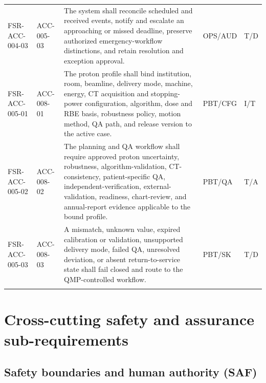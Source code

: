 \documentclass[11pt,letterpaper]{article}
\begin{document}
\begin{scriptsize}
\begin{longtable}{@{}L{0.16\textwidth}L{0.12\textwidth}L{0.45\textwidth}L{0.15\textwidth}L{0.07\textwidth}@{}}
\addlinespace[2pt]
\mbox{FSR-ACC-004-03} & \mbox{ACC-005-03} & The system shall reconcile scheduled and received events, notify and escalate an approaching or missed deadline, preserve authorized emergency-workflow distinctions, and retain resolution and exception approval. & OPS\slash\allowbreak{}AUD & T\slash\allowbreak{}D \\
\addlinespace[2pt]
\mbox{FSR-ACC-005-01} & \mbox{ACC-008-01} & The proton profile shall bind institution, room, beamline, delivery mode, machine, energy, CT acquisition and stopping-power configuration, algorithm, dose and RBE basis, robustness policy, motion method, QA path, and release version to the active case. & PBT\slash\allowbreak{}CFG & I\slash\allowbreak{}T \\
\addlinespace[2pt]
\mbox{FSR-ACC-005-02} & \mbox{ACC-008-02} & The planning and QA workflow shall require approved proton uncertainty, robustness, algorithm-validation, CT-consistency, patient-specific QA, independent-verification, external-validation, readiness, chart-review, and annual-report evidence applicable to the bound profile. & PBT\slash\allowbreak{}QA & T\slash\allowbreak{}A \\
\addlinespace[2pt]
\mbox{FSR-ACC-005-03} & \mbox{ACC-008-03} & A mismatch, unknown value, expired calibration or validation, unsupported delivery mode, failed QA, unresolved deviation, or absent return-to-service state shall fail closed and route to the QMP-controlled workflow. & PBT\slash\allowbreak{}SK & T\slash\allowbreak{}D \\
\addlinespace[2pt]
\end{longtable}
\end{scriptsize}

\section{Cross-cutting safety and assurance sub-requirements}

\subsection{Safety boundaries and human authority (SAF)}
\end{document}
